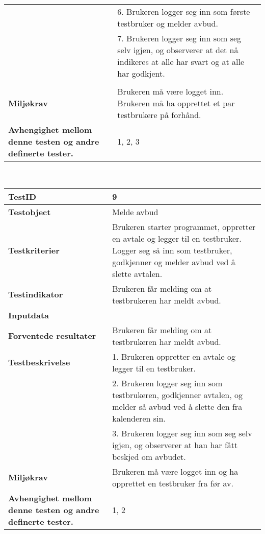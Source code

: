 \begin{tabularx}{1.2\textwidth}{| p{5cm} | X |}
																			& 6. Brukeren logger seg inn som første testbruker og melder avbud.\\
																			& 7. Brukeren logger seg inn som seg selv igjen, og observerer at det nå indikeres at alle har svart og at alle har godkjent.	\\				\\ \hline
	\textbf{Miljøkrav}			 												& Brukeren må være logget inn. Brukeren må ha opprettet et par testbrukere på forhånd.						\\ \hline
	\textbf{Avhengighet mellom denne testen og andre definerte tester.}		 				& 1, 2, 3				 													\\ \hline
	\end{tabularx}

\mbox{}\\

	\begin{tabularx}{1.2\textwidth}{| p{5cm} | X |}
	\hline
	\textbf{TestID} 																& 9																	\\ \hline
	\textbf{Testobject} 															& Melde avbud															\\ \hline
	\textbf{Testkriterier} 															& Brukeren starter programmet, oppretter en avtale og legger til en testbruker. Logger seg så inn som testbruker, godkjenner og melder avbud ved å slette avtalen.						\\ \hline
	\textbf{Testindikator} 															& Brukeren får melding om at testbrukeren har meldt avbud.													\\ \hline
	\textbf{Inputdata} 															& 														\\  \hline
	\textbf{Forventede resultater}									 				& Brukeren får melding om at testbrukeren har meldt avbud.				\\ \hline
	\textbf{Testbeskrivelse} 														& 1. Brukeren oppretter en avtale og legger til en testbruker.\\
																			& 2. Brukeren logger seg inn som testbrukeren, godkjenner avtalen, og melder så avbud ved å slette den fra kalenderen sin.\\
																			& 3. Brukeren logger seg inn som seg selv igjen, og observerer at han har fått beskjed om avbudet.					\\ \hline
	\textbf{Miljøkrav}			 												& Brukeren må være logget inn og ha opprettet en testbruker fra før av.						\\ \hline
	\textbf{Avhengighet mellom denne testen og andre definerte tester.}		 				& 1, 2 				 													\\ \hline
	\end{tabularx}


